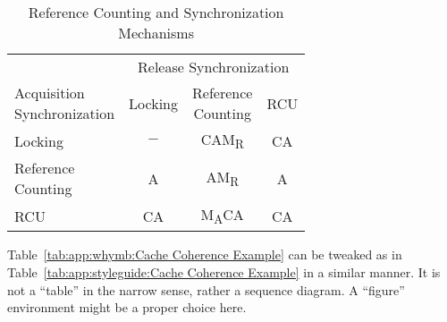 \begin{table}[tb]
\small
\centering
\renewcommand*{\arraystretch}{1.25}
\begin{tabular}{lccc}
	\toprule
	& \multicolumn{3}{c}{Release Synchronization} \\
	\cmidrule(l){2-4}
	\parbox[c]{.8in}{Acquisition\\Synchronization}
			& Locking
				& \parbox[c]{.5in}{Reference\\Counting}
				        & RCU \\
	 \cmidrule(l){2-4}
	Locking		& $-$	& CAM\textsubscript{R}	& CA  \\
	\parbox[c][6ex]{.8in}{Reference\\Counting}
			& A	& AM\textsubscript{R}	& A   \\
	RCU		& CA	& M\textsubscript{A}CA	& CA  \\
	\bottomrule
\end{tabular}

\vspace{5pt}\hfill
{}
\caption{Reference Counting and Synchronization Mechanisms}
\label{tab:app:styleguide:Reference Counting and Synchronization Mechanisms}
\end{table}

Table~\ref{tab:app:whymb:Cache Coherence Example}
can be tweaked as in
Table~\ref{tab:app:styleguide:Cache Coherence Example}
in a similar manner.
It is not a ``table'' in the narrow sense, rather a sequence diagram.
A ``figure'' environment might be a proper choice here.

